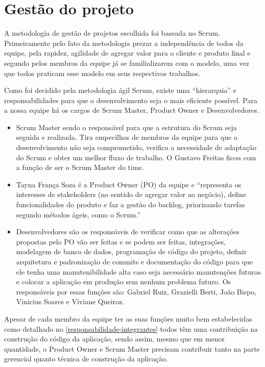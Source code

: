 \chapter{Gestão do projeto}

A metodologia de gestão de projetos escolhida foi baseada no Scrum. Primeiramente pelo fato da metodologia prezar a independência de todos da equipe, pela rapidez, agilidade de agregar valor para o cliente e produto final e segundo pelos membros da equipe já se familializarem com o modelo, uma vez que todos praticam esse modelo em seus respectivos trabalhos. 

Como foi decidido pela metodologia ágil Scrum, existe uma “hierarquia” e responsabilidades para que o desenvolvimento seja o mais eficiente possível. Para a nossa equipe há os cargos de Scrum Master, Product Owner e Desenvolvedores.

\begin{itemize}
	\item Scrum Master sendo o responsável para que a estrutura do Scrum seja seguida e realizada. Tira empecilhos de membros da equipe para que o desenvolvimento não seja comprometido, verifica a necessidade de adaptação do Scrum e obter um melhor fluxo de trabalho. O Gustavo Freitas ficou com a função de ser o Scrum Master do time.
	
	\item Tayna França Soza é a Product Owner (PO) da equipe e “representa os interesses de stakeholders (no sentido de agregar valor ao negócio), define funcionalidades do produto e faz a gestão do backlog, priorizando tarefas segundo métodos ágeis, como o Scrum.” \cite{especificações_do_PO}
	
	\item Desenvolvedores são os responsáveis de verificar como que as alterações propostas pelo PO vão ser feitas e se podem ser feitas, integrações, modelagem de banco de dados, programação de código do projeto, definir arquitetura e padronização de commits e documentação do código para que ele tenha uma manutenibilidade alta caso seja necessário manutenções futuras e colocar a aplicação em produção sem nenhum problema futuro. Os responsáveis por essas funções são: Gabriel Ruiz, Grazielli Berti, João Bispo, Vinicius Soares e Viviane Queiroz.
	
\end{itemize}

Apesar de cada membro da equipe ter as suas funções muito bem estabelecidas como detalhado no \autoref{responsabilidade-integrantes} todos têm uma contribuição na construção do código da aplicação, sendo assim, mesmo que em menor quantidade, o Product Owner e Scrum Master precisam contribuir tanto na parte gerencial quanto técnica de construção da aplicação. 

